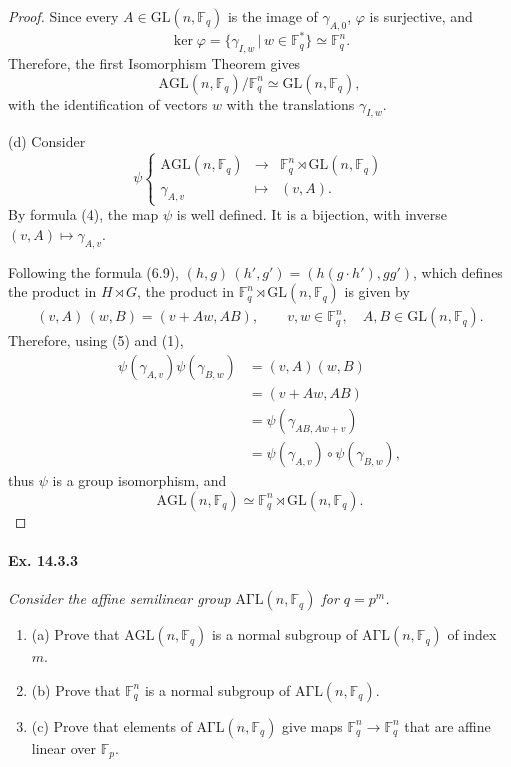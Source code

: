 \documentclass[11pt,a4paper]{article}
\newcommand{\be} {\begin{enumerate}}
\newcommand{\ee} {\end{enumerate}}
\newcommand{\F}{\mathbb{F}}
\begin{document}
\begin{proof}
Since every $A \in \mathrm{GL}(n,\F_q)$ is the image of $\gamma_{A,0}$, $\varphi$ is surjective, and
$$\ker \varphi = \{\gamma_{I,w} \, |\, w \in \F_q^*\} \simeq \F_q^n.$$
Therefore, the first Isomorphism Theorem gives
$$\mathrm{AGL}(n,\F_q)/ \F_q^n \simeq \mathrm{GL}(n,\F_q),$$
with the identification of vectors $w$ with the translations $\gamma_{I,w}$.

\item[(d)] Consider
$$
\psi
\left\{
\begin{array}{ccc}
\mathrm{AGL}(n,\F_q) & \to & \F_q^n \rtimes \mathrm{GL}(n,\F_q)\\
\gamma_{A,v} & \mapsto & (v,A).
\end{array}
\right.
$$
By formula (4), the map $\psi$ is well defined. It is a bijection, with inverse $(v,A) \mapsto \gamma_{A,v}$.

Following the formula (6.9), $(h,g)\, (h',g') = (h(g\cdot h'), gg')$, which defines the product in $H \rtimes G$, the product in $\F_q^n \rtimes \mathrm{GL}(n,\F_q)$ is given by
\begin{align}
(v,A)\, (w,B) = (v+ Aw,AB),\qquad v,w \in \F_q^n, \quad A,B \in \mathrm{GL}(n,\F_q).
\end{align}
Therefore, using (5) and (1),
\begin{align*}
\psi(\gamma_{A,v})  \psi(\gamma_{B,w}) &= (v,A)(w,B)\\
&= (v+ Aw,AB)\\
&=\psi(\gamma_{AB,Aw+v})\\
&=\psi(\gamma_{A,v}) \circ \psi(\gamma_{B,w}), 
\end{align*}
thus $\psi$ is a group isomorphism, and
$$\mathrm{AGL}(n,\F_q) \simeq \F_q^n \rtimes \mathrm{GL}(n,\F_q).$$
\end{proof}

 \paragraph{Ex. 14.3.3}{\it
 Consider the affine semilinear group $\mathrm{A\Gamma L}(n,\F_q)$ for $q = p^m$.
 \be
 \item[(a)] Prove that $\mathrm{AGL}(n,\F_q)$ is a normal subgroup of $\mathrm{A\Gamma L}(n,\F_q)$ of index $m$.
 \item[(b)] Prove that $\F_q^n$ is a normal subgroup of $\mathrm{A\Gamma L}(n,\F_q)$.
 \item[(c)] Prove that elements of $\mathrm{A\Gamma L}(n,\F_q)$ give maps $\F_q^n \to \F_q^n$ that are affine linear over $\F_p$.
 \ee
 }
 
\end{document}
